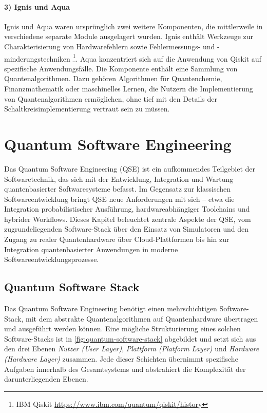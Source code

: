 \paragraph{3) Ignis und Aqua}
Ignis und Aqua waren ursprünglich zwei weitere Komponenten, die mittlerweile in verschiedene separate Module ausgelagert wurden. Ignis enthält Werkzeuge zur Charakterisierung von Hardwarefehlern sowie Fehlermessungs- und -minderungstechniken \footnote{IBM Qiskit \url{https://www.ibm.com/quantum/qiskit/history}}. Aqua konzentriert sich auf die Anwendung von Qiskit auf spezifische Anwendungsfälle. Die Komponente enthält eine Sammlung von Quantenalgorithmen. Dazu gehören Algorithmen für Quantenchemie, Finanzmathematik oder maschinelles Lernen, die Nutzern die Implementierung von Quantenalgorithmen ermöglichen, ohne tief mit den Details der Schaltkreisimplementierung vertraut sein zu müssen. \autocite{javadi-abhariQuantumComputingQiskit2024a}

\section{Quantum Software Engineering}

Das Quantum Software Engineering (QSE) ist ein aufkommendes Teilgebiet der Softwaretechnik, das sich mit der Entwicklung, Integration und Wartung quantenbasierter Softwaresysteme befasst. Im Gegensatz zur klassischen Softwareentwicklung bringt QSE neue Anforderungen mit sich – etwa die Integration probabilistischer Ausführung, hardwareabhängiger Toolchains und hybrider Workflows. \autocite{zhao_quantum-based_2025} Dieses Kapitel beleuchtet zentrale Aspekte der QSE, vom zugrundeliegenden Software-Stack über den Einsatz von Simulatoren und den Zugang zu realer Quantenhardware über Cloud-Plattformen bis hin zur Integration quantenbasierter Anwendungen in moderne Softwareentwicklungsprozesse.

\subsection{Quantum Software Stack}
\label{sec:quantum-software-stack}

Das Quantum Software Engineering benötigt einen mehrschichtigen Software-Stack, mit dem abstrakte Quantenalgorithmen auf Quantenhardware übertragen und ausgeführt werden können. Eine mögliche Strukturierung eines solchen Software-Stacks ist in \autoref{fig:quantum-software-stack} abgebildet und setzt sich aus den drei Ebenen \emph{Nutzer (User Layer)}, \emph{Plattform (Platform Layer)} und \emph{Hardware (Hardware Layer)} zusammen. Jede dieser Schichten übernimmt spezifische Aufgaben innerhalb des Gesamtsystems und abstrahiert die Komplexität der darunterliegenden Ebenen.
\\

